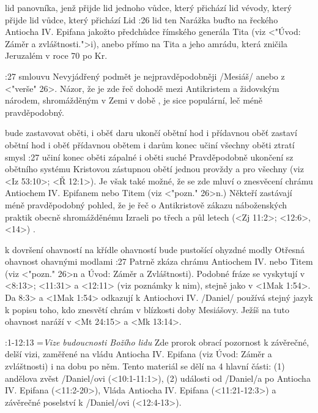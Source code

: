     {lid panovníka, jenž přijde}   %
    {lid jednoho vůdce, který přichází}   %
    {lid vévody, který přijde}   %
    {lid vůdce, který přichází}   %
    {Lid}   %
:26 {lid ten} Narážka buďto na řeckého Antiocha IV. Epifana jakožto předchůdce římského generála Tita (viz <"Úvod: Záměr a zvláštnosti.">i), anebo přímo na Tita a jeho amrádu, která zničila Jeruzalém v roce 70 po Kr.

:27 {smlouvu} Nevyjádřený podmět  je nejpravděpodobněji \x/Mesiáš/ anebo  z <"verše" 26>. Názor, že je zde řeč dohodě mezi Antikristem a židovským národem, shromážděným v Zemi v době , je sice populární, leč méně pravděpodobný.

 {bude zastavovat oběti, i oběť daru} {ukončí obětní hod i přídavnou oběť} {zastaví obětní hod i oběť přídavnou} {obětem i darům konec učiní} {všechny oběti ztratí smysl}
:27 {učiní konec oběti zápalné i oběti suché} Pravděpodobně ukončení sz obětního systému Kristovou zástupnou obětí jednou provždy a pro všechny (viz <Iz 53:10>; <Ř 12:1>).
Je však také možné, že se zde mluví o znesvěcení chrámu  Antiochem IV. Epifanem nebo Titem (viz <"pozn." 26>n.) Někteří zastávají méně pravděpodobný pohled, že je řeč o Antikristově zákazu náboženských praktik obecně shromážděnému Izraeli po třech a půl letech (<Zj 11:2>; <12:6>, <14>)  .

    {k dovršení ohavností}   %
    {na křídle ohavností bude pustošící}   %
    {ohyzdné modly}   %
    {Otřesná ohavnost}   %
    {ohavnými modlami}   %
:27 {} Patrně zkáza chrámu Antiochem IV. nebo Titem (viz <"pozn." 26>n a Úvod: Záměr a Zvláštnosti). Podobné fráze se vyskytují v <8:13>; <11:31> a <12:11> (viz poznámky k nim), stejně jako v <1Mak 1:54>. \<Da 8:3> a <1Mak 1:54> odkazují k Antiochovi IV. \x/Daniel/ používá stejný jazyk k popisu toho, kdo znesvětí chrám v blízkosti doby Mesiášovy. Ježíš na tuto ohavnost naráží v <Mt 24:15> a <Mk 13:14>.



:1-12:13 {}={\it Vize budoucnosti Božího lidu} Zde prorok obrací pozornost k  závěrečné, delší vizi, zaměřené na vládu Antiocha IV. Epifana (viz Úvod: Záměr a zvláštnosti) i na dobu po něm. Tento materiál se dělí na 4 hlavní části: (1) andělova zvěst \x/Daniel/ovi (<10:1-11:1>), (2) události od \x/Daniel/a po Antiocha IV. Epifana  (<11:2-20>), Vláda Antiocha IV. Epifana (<11:21-12:3>) a závěrečné poselství k \x/Daniel/ovi (<12:4-13>). 


